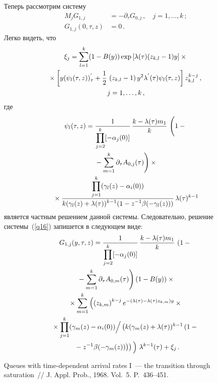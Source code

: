 \begin{multicols}{2}
Теперь рассмотрим систему
\begin{align*}
M_{j}G_{1,j}&=-\partial_{\tau}G_{0,j}\,,\quad  j=1,\ldots ,k\,;
\\
G_{1,j}(0,\tau,z)&=0\,. 
\end{align*}
Легко видеть, что
\begin{multline*}
\xi_{j}=\sum_{l=1}^{k}(1-B(y))\exp\left[\lambda(\tau)(z_{k,l}-1)y\right]\times{}\\
\!\!{}\times \left[y(\psi_{l}(\tau,
z))^{'}_{\tau}+
\displaystyle\frac{\displaystyle 1\mathstrut}{\displaystyle 2\mathstrut}\,\left(z_{k,l}-1\right)y^{2}\lambda^{'}(\tau)\psi_{l}(\tau,
z)\right ]z^{k-j}_{k,l}\,,\\
j=1,\ldots , k\,,
\end{multline*}
где
\begin{multline*}
\psi_{l}(\tau, z)=\fr{1}{\prod\limits_{j=2}^{k}[-\alpha_{j}(0)]}\,\fr{k-\lambda(\tau)m_{1}}{k}\,
\left(
\vphantom{\sum_{m=1}^{k}}
 1-{}\right.\\
\left.{}-\sum_{m=1}^{k}\partial_{\tau}A_{0,j}(\tau)\right)\times{}\\
{}\times
\fr{\prod\limits_{j=1}^{k}(\gamma_{l}(z)-\alpha_{i}(0))}{k(\gamma_{l}(z)+\lambda(\tau))^{k-1}(1-z^{-1}
\beta(-\gamma_{l}(z)))}\,\lambda(\tau)^{k-1}
\end{multline*}
является частным решением данной системы.
 Следовательно, решение системы~(\ref{q16}) запишется в следующем виде:
\begin{multline*}
G_{1,j}(y,\tau,z)=\fr{1}{\prod\limits_{j=2}^{k}[-\alpha_{j}(0)]}
\,\fr{k-\lambda(\tau)m_{1}}{k}\,\left(1-{}\right.\\
\left.{}-\sum_{m=1}^{k}\partial_{\tau}A_{0,m}(\tau)\right) (1-B(y))\times{}\\
{} \times
\sum_{m=1}^{k}
\left (\left(z_{k,m}\right)^{k-j} e^{-(\lambda
(\tau)-\lambda(\tau)z_{k,m})y}\times{}\right.\\
{}\times\prod\limits_{j=1}^{k}(\gamma_{m}(z)-\alpha_{i}(0))\Big /
\left (k(\gamma_{m}(z)+\lambda
(\tau))^{k-1}\left(1-{}\right.\right.\\
\left.\left.\left.{}-z^{-1}
\beta(-\gamma_{m}(z))\right)\right )
\vphantom{\left(z_{k,m}\right)^{k-j}}
\right )\,\lambda^{k-1}(\tau)+\xi_{j}\,.
\end{multline*}


{\small\frenchspacing
{%
\begin{thebibliography}{9}    

Queues with time-dependent arrival rates I~--- the transition through saturation~// 
J. Appl. Prob., 1968. Vol.~5. P.~436--451.


\end{thebibliography}}}
\end{multicols}
